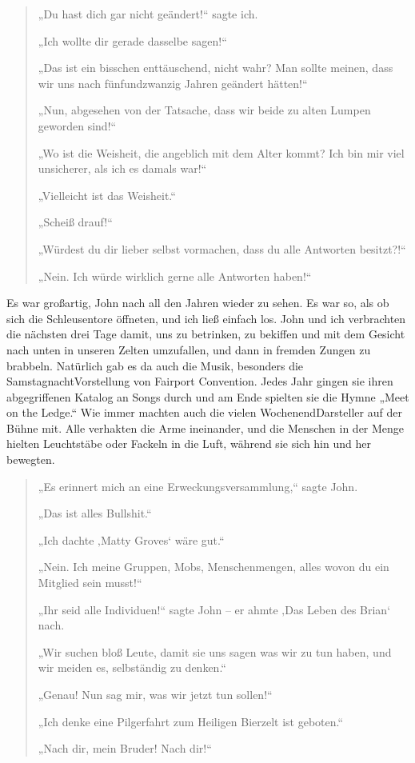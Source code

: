 \documentclass[12pt]{memoir}
\begin{document}
\begin{quote}
„Du hast dich gar nicht geändert!“ sagte ich.

„Ich wollte dir gerade dasselbe sagen!“

„Das ist ein bisschen enttäuschend, nicht wahr?
Man sollte meinen,
dass wir uns nach fünfundzwanzig Jahren geändert hätten!“

„Nun, abgesehen von der Tatsache,
dass wir beide zu alten Lumpen geworden sind!“

„Wo ist die Weisheit, die angeblich mit dem Alter kommt?
Ich bin mir viel unsicherer, als ich es damals war!“

„Vielleicht ist das Weisheit.“

„Scheiß drauf!“

„Würdest du dir lieber selbst vormachen, dass du alle Antworten besitzt?!“

„Nein. Ich würde wirklich gerne alle Antworten haben!“
\end{quote}

Es war großartig, John nach all den Jahren wieder zu sehen.
Es war so, als ob sich die Schleusentore öffneten,
und ich ließ einfach los.
John und ich verbrachten die nächsten drei Tage damit,
uns zu betrinken, zu bekiffen und mit dem Gesicht
nach unten in unseren Zelten umzufallen,
und dann in fremden Zungen zu brabbeln.
Natürlich gab es da auch die Musik,
besonders die Samstagnacht\–Vorstellung von Fairport Convention.
Jedes Jahr gingen sie ihren abgegriffenen Katalog an Songs durch
und am Ende spielten sie die Hymne „Meet on the Ledge.“
Wie immer machten auch die vielen Wochenend\–Darsteller auf der Bühne mit.
Alle verhakten die Arme ineinander,
und die Menschen in der Menge hielten Leuchtstäbe oder Fackeln in die Luft,
während sie sich hin und her bewegten.

\begin{quote}
„Es erinnert mich an eine Erweckungsversammlung,“ sagte John.

„Das ist alles Bullshit.“

„Ich dachte ‚Matty Groves‘ wäre gut.“

„Nein. Ich meine Gruppen, Mobs, Menschenmengen,
alles wovon du ein Mitglied sein musst!“

„Ihr seid alle Individuen!“ sagte John –
er ahmte ‚Das Leben des Brian‘ nach.

„Wir suchen bloß Leute, damit sie uns sagen was wir zu tun haben,
und wir meiden es, selbständig zu denken.“

„Genau! Nun sag mir, was wir jetzt tun sollen!“

„Ich denke eine Pilgerfahrt zum Heiligen Bierzelt ist geboten.“

„Nach dir, mein Bruder! Nach dir!“
\end{quote}
\end{document}
